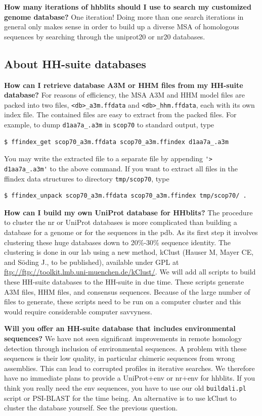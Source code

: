 \documentclass[11pt,a4paper]{article}
\begin{document}
{\bf How many iterations of hhblits should I use to search my customized genome database?} One iteration! Doing more than one search iterations in general only makes sense in order to build up a diverse MSA of homologous sequences by searching through the uniprot20 or nr20 databases. 



\subsection{About HH-suite databases}


{\bf How can I retrieve database A3M or HHM files from my HH-suite database?}
For reasons of efficiency, the MSA A3M and HHM model files are packed into two files, \verb`<db>_a3m.ffdata` and \verb`<db>_hhm.ffdata`, each with its own index file. The contained files are easy to extract from the packed files. For example, to dump \verb`d1aa7a_.a3m` in \verb`scop70` to standard output, type 
\begin{verbatim}
$ ffindex_get scop70_a3m.ffdata scop70_a3m.ffindex d1aa7a_.a3m
\end{verbatim}
You may write the extracted file to a separate file by appending \verb`'> d1aa7a_.a3m'` to the above command.
If you want to extract all files in the ffindex data structures to directory \verb`tmp/scop70`, type
\begin{verbatim}
$ ffindex_unpack scop70_a3m.ffdata scop70_a3m.ffindex tmp/scop70/ .
\end{verbatim}

{\bf How can I build my own UniProt database for HHblits?}
The procedure to cluster the nr or UniProt databases is more complicated than building a database for a genome or for the sequences in the pdb. As its first step it involves clustering these huge databases down to 20\%-30\% sequence identity. The clustering is done in our lab using a new method, kClust (Hauser M, Mayer CE, and S\"oding J., to be published), available under GPL at \url{ftp://ftp://toolkit.lmb.uni-muenchen.de/kClust/}. We will add all scripts to build these HH-suite databases to the HH-suite in due time. These scripts generate A3M files, HHM files, and consensus sequences. Because of the large number of files to generate, these scripts need to be run on a computer cluster and this would require considerable computer savvyness. 

{\bf Will you offer an HH-suite database that includes environmental sequences?}
We have not seen significant improvements in remote homology detection through inclusion of environmental sequences. A problem with these sequences is their low quality, in particular chimeric sequences from wrong assemblies. This can lead to corrupted profiles in iterative searches. We therefore have no immediate plans to provide a UniProt+env or nr+env for hhblits. If you think you really need the env sequences, you have to use our old \verb`buildali.pl` script or PSI-BLAST for the time being. An alternative is to use kClust to cluster the database yourself. See the previous question.
\end{document}
